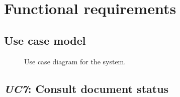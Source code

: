 \documentclass[a4paper,10pt]{article}
\begin{document}
\section{Functional requirements}\label{sec:functional}
\subsection*{Use case model}

\begin{figure}[!htp]
    \centering
    \caption{Use case diagram for the system.}\label{fig:use_case_model}
\end{figure}

\subsection{\emph{UC7}: Consult document status}
\label{usecase:consultdocstatus}
\end{document}
